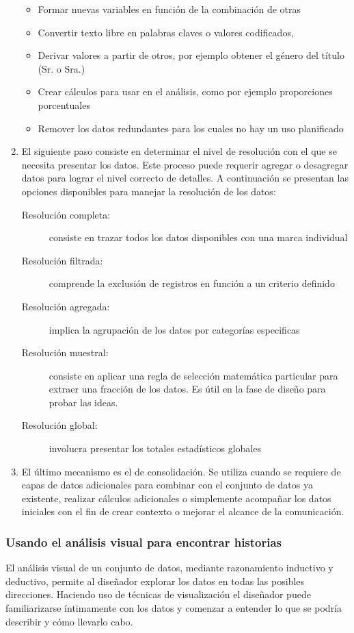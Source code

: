 \begin{enumerate}
\begin{itemize}
    \item Formar nuevas variables en función de la combinación de otras
    \item Convertir texto libre en palabras claves o valores codificados,
    \item Derivar valores a partir de otros, por ejemplo obtener el género del título (Sr. o Sra.)
    \item Crear cálculos para usar en el análisis, como por ejemplo proporciones porcentuales
    \item Remover los datos redundantes para los cuales no hay un uso planificado
  \end{itemize}
  \item El siguiente paso consiste en determinar el nivel de resolución con el que se necesita presentar los datos. Este proceso puede requerir agregar o desagregar datos para lograr el nivel correcto de detalles. A continuación se presentan las opciones disponibles para manejar la resolución de los datos:
  \begin{description}
    \item[Resolución completa:] consiste en trazar todos los datos disponibles con una marca individual
    \item[Resolución filtrada:] comprende la exclusión de registros en función a un criterio definido
    \item[Resolución agregada:] implica la agrupación de los datos por categorías especificas
    \item[Resolución muestral:] consiste en aplicar una regla de selección matemática particular para extraer una fracción de los datos. Es útil en la fase de diseño para probar las ideas.
    \item[Resolución global:] involucra presentar los totales estadísticos globales
  \end{description}
  \item El último mecanismo es el de consolidación. Se utiliza cuando se requiere de capas de datos adicionales para combinar con el conjunto de datos ya existente, realizar cálculos adicionales o simplemente acompañar los datos iniciales con el fin de crear contexto o mejorar el alcance de la comunicación.
\end{enumerate}

\subsubsection{Usando el análisis visual para encontrar historias}
El análisis visual de un conjunto de datos, mediante razonamiento inductivo y deductivo, permite al diseñador explorar los datos en todas las posibles direcciones. Haciendo uso de técnicas de visualización el diseñador puede familiarizarse íntimamente con los datos y comenzar a entender lo que se podría describir y cómo llevarlo cabo.

